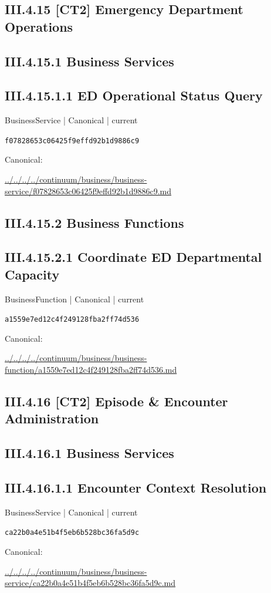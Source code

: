 \documentclass[10pt,a4paper]{article}
\begin{document}
\subsection*{III.4.15 [CT2] Emergency Department Operations}
\subsection*{III.4.15.1 Business Services}
\subsection*{III.4.15.1.1 ED Operational Status Query}
{\small BusinessService | Canonical | current}\par
\texttt{f07828653c06425f9effd92b1d9886c9}\par
Canonical: \par
{\footnotesize\url{../../../../continuum/business/business-service/f07828653c06425f9effd92b1d9886c9.md}}\par
\subsection*{III.4.15.2 Business Functions}
\subsection*{III.4.15.2.1 Coordinate ED Departmental Capacity}
{\small BusinessFunction | Canonical | current}\par
\texttt{a1559e7ed12c4f249128fba2ff74d536}\par
Canonical: \par
{\footnotesize\url{../../../../continuum/business/business-function/a1559e7ed12c4f249128fba2ff74d536.md}}\par
\subsection*{III.4.16 [CT2] Episode \& Encounter Administration}
\subsection*{III.4.16.1 Business Services}
\subsection*{III.4.16.1.1 Encounter Context Resolution}
{\small BusinessService | Canonical | current}\par
\texttt{ca22b0a4e51b4f5eb6b528bc36fa5d9c}\par
Canonical: \par
{\footnotesize\url{../../../../continuum/business/business-service/ca22b0a4e51b4f5eb6b528bc36fa5d9c.md}}\par
\end{document}
